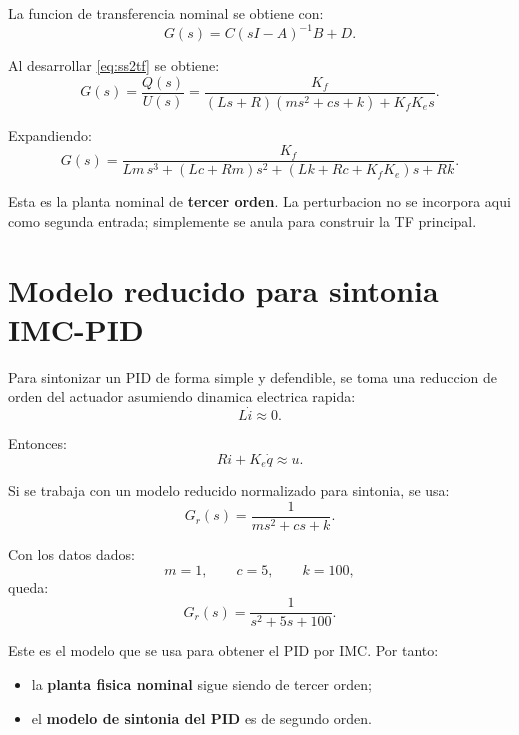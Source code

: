 \documentclass[11pt]{article}
\begin{document}
La funcion de transferencia nominal se obtiene con:
\begin{equation}
G(s)=C(sI-A)^{-1}B+D.
\label{eq:ss2tf}
\end{equation}

Al desarrollar \eqref{eq:ss2tf} se obtiene:
\begin{equation}
G(s)=\frac{Q(s)}{U(s)}
=
\frac{K_f}
{(Ls+R)(ms^2+cs+k)+K_fK_e s}.
\label{eq:tf_3rd}
\end{equation}

Expandiendo:
\begin{equation}
G(s)=
\frac{K_f}
{Lm\,s^3 + (Lc+Rm)s^2 + (Lk+Rc+K_fK_e)s + Rk}.
\end{equation}

Esta es la planta nominal de \textbf{tercer orden}. La perturbacion no se incorpora aqui como segunda entrada; simplemente se anula para construir la TF principal.

\section{Modelo reducido para sintonia IMC-PID}

Para sintonizar un PID de forma simple y defendible, se toma una reduccion de orden del actuador asumiendo dinamica electrica rapida:
\begin{equation}
L\dot i \approx 0.
\end{equation}

Entonces:
\begin{equation}
Ri + K_e\dot q \approx u.
\end{equation}

Si se trabaja con un modelo reducido normalizado para sintonia, se usa:
\begin{equation}
G_r(s)=\frac{1}{ms^2+cs+k}.
\label{eq:reduced_tf}
\end{equation}

Con los datos dados:
\[
m=1,\qquad c=5,\qquad k=100,
\]
queda:
\begin{equation}
G_r(s)=\frac{1}{s^2+5s+100}.
\label{eq:tf_num}
\end{equation}

Este es el modelo que se usa para obtener el PID por IMC. Por tanto:

\begin{itemize}[leftmargin=1.2cm]
\item la \textbf{planta fisica nominal} sigue siendo de tercer orden;
\item el \textbf{modelo de sintonia del PID} es de segundo orden.
\end{itemize}
\end{document}
